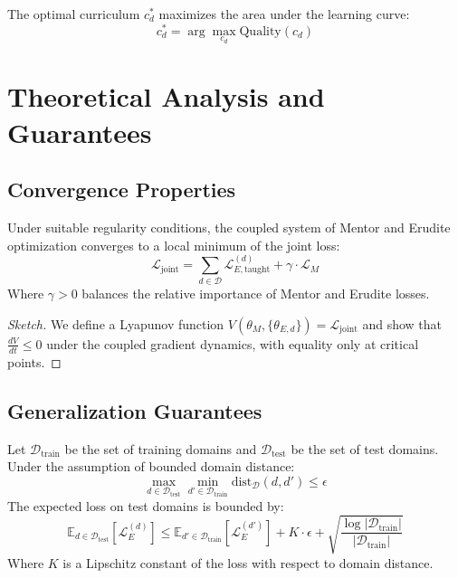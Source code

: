 \begin{theorem}
The optimal curriculum $c_d^*$ maximizes the area under the learning curve:
\begin{equation}
c_d^* = \arg\max_{c_d} \text{Quality}(c_d)
\end{equation}
\end{theorem}

\section{Theoretical Analysis and Guarantees}

\subsection{Convergence Properties}

\begin{theorem}
Under suitable regularity conditions, the coupled system of Mentor and Erudite optimization converges to a local minimum of the joint loss:
\begin{equation}
\mathcal{L}_{\text{joint}} = \sum_{d \in \mathcal{D}} \mathcal{L}_{E,\text{taught}}^{(d)} + \gamma \cdot \mathcal{L}_M
\end{equation}
Where $\gamma > 0$ balances the relative importance of Mentor and Erudite losses.
\end{theorem}

\begin{proof}[Sketch]
We define a Lyapunov function $V(\theta_M, \{\theta_{E,d}\}) = \mathcal{L}_{\text{joint}}$ and show that $\frac{dV}{dt} \leq 0$ under the coupled gradient dynamics, with equality only at critical points.
\end{proof}

\subsection{Generalization Guarantees}

\begin{theorem}
Let $\mathcal{D}_{\text{train}}$ be the set of training domains and $\mathcal{D}_{\text{test}}$ be the set of test domains. Under the assumption of bounded domain distance:
\begin{equation}
\max_{d \in \mathcal{D}_{\text{test}}} \min_{d' \in \mathcal{D}_{\text{train}}} \text{dist}_{\mathcal{D}}(d, d') \leq \epsilon
\end{equation}
The expected loss on test domains is bounded by:
\begin{equation}
\mathbb{E}_{d \in \mathcal{D}_{\text{test}}} [\mathcal{L}_E^{(d)}] \leq \mathbb{E}_{d' \in \mathcal{D}_{\text{train}}} [\mathcal{L}_E^{(d')}] + K \cdot \epsilon + \sqrt{\frac{\log|\mathcal{D}_{\text{train}}|}{|\mathcal{D}_{\text{train}}|}}
\end{equation}
Where $K$ is a Lipschitz constant of the loss with respect to domain distance.
\end{theorem}

